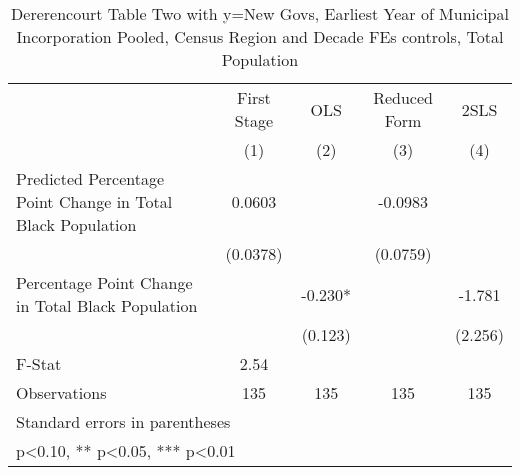 \begin{table}[htbp]\centering
\def\sym#1{\ifmmode^{#1}\else\(^{#1}\)\fi}
\caption{Dererencourt Table Two with y=New Govs, Earliest Year of Municipal Incorporation  Pooled, Census Region and Decade FEs controls, Total Population}
\begin{tabular}{l*{4}{c}}
\toprule
                    & First Stage   &         OLS   &Reduced Form   &        2SLS   \\
                    &\multicolumn{1}{c}{(1)}   &\multicolumn{1}{c}{(2)}   &\multicolumn{1}{c}{(3)}   &\multicolumn{1}{c}{(4)}   \\
\midrule
Predicted Percentage Point Change in Total Black Population&      0.0603   &               &     -0.0983   &               \\
                    &    (0.0378)   &               &    (0.0759)   &               \\
\addlinespace
Percentage Point Change in Total Black Population&               &      -0.230*  &               &      -1.781   \\
                    &               &     (0.123)   &               &     (2.256)   \\
\midrule
F-Stat              &        2.54   &               &               &               \\
Observations        &         135   &         135   &         135   &         135   \\
\bottomrule
\multicolumn{5}{l}{\footnotesize Standard errors in parentheses}\\
\multicolumn{5}{l}{\footnotesize * p<0.10, ** p<0.05, *** p<0.01}\\
\end{tabular}
\end{table}
